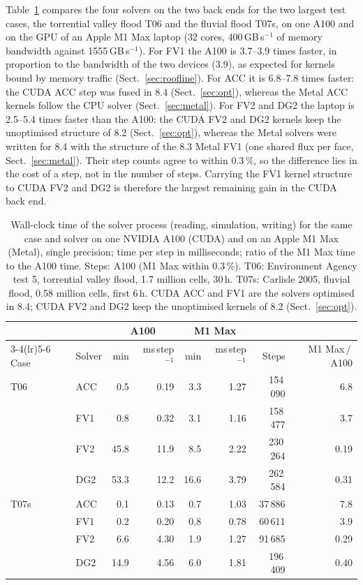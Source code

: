 \documentclass[gmd, manuscript]{copernicus}
\begin{document}
Table~\ref{tab:metaltime} compares the four solvers on the two back ends
for the two largest test cases, the torrential valley flood T06 and the
fluvial flood T07s, on one A100 and on the GPU of an Apple M1 Max laptop (32 cores, 400\,GB\,s$^{-1}$ of memory bandwidth against
1555\,GB\,s$^{-1}$). For FV1 the A100 is 3.7--3.9 times faster, in
proportion to the bandwidth of the two devices (3.9), as expected for kernels
bound by memory traffic (Sect.~\ref{sec:roofline}). For ACC it is 6.8--7.8
times faster: the CUDA ACC step was fused in 8.4 (Sect.~\ref{sec:opt}),
whereas the Metal ACC kernels follow the CPU solver (Sect.~\ref{sec:metal}).
For FV2 and DG2 the laptop is
2.5--5.4 times faster than the A100: the CUDA FV2 and DG2 kernels keep the
unoptimised structure of 8.2 (Sect.~\ref{sec:opt}), whereas the Metal
solvers were written for 8.4
with the structure of the 8.3 Metal FV1 (one shared flux per face,
Sect.~\ref{sec:metal}). Their step counts agree to within 0.3\,\%, so the
difference lies in the cost of a step, not in the number of steps. Carrying
the FV1 kernel structure to CUDA FV2 and DG2 is therefore the largest
remaining gain in the CUDA back end.

\begin{table}[t]
\centering\small
\caption{Wall-clock time of the solver process (reading, simulation, writing)
for the same case and solver on one NVIDIA A100 (CUDA) and on an Apple M1
Max (Metal), single precision; time per step in milliseconds; ratio of the M1
Max time to the A100 time. Steps: A100 (M1 Max within 0.3\,\%). T06:
Environment Agency test 5, torrential valley flood, 1.7 million cells, 30\,h.
T07s: Carlisle 2005, fluvial flood, 0.58 million cells, first 6\,h. CUDA ACC
and FV1 are the solvers optimised in 8.4; CUDA FV2 and DG2 keep the
unoptimised kernels of 8.2 (Sect.~\ref{sec:opt}).}
\label{tab:metaltime}
\begin{tabular}{@{}llrrrrrr@{}}
\toprule
& & \multicolumn{2}{c}{A100} & \multicolumn{2}{c}{M1 Max} & & \\
\cmidrule(lr){3-4}\cmidrule(lr){5-6}
Case & Solver & min & ms\,step$^{-1}$ & min & ms\,step$^{-1}$ & Steps & M1 Max\,/\,A100 \\
\midrule
T06 & ACC & 0.5 & 0.19 & 3.3 & 1.27 & 154\,090 & 6.8 \\
 & FV1 & 0.8 & 0.32 & 3.1 & 1.16 & 158\,477 & 3.7 \\
 & FV2 & 45.8 & 11.9 & 8.5 & 2.22 & 230\,264 & 0.19 \\
 & DG2 & 53.3 & 12.2 & 16.6 & 3.79 & 262\,584 & 0.31 \\
T07s & ACC & 0.1 & 0.13 & 0.7 & 1.03 & 37\,886 & 7.8 \\
 & FV1 & 0.2 & 0.20 & 0.8 & 0.78 & 60\,611 & 3.9 \\
 & FV2 & 6.6 & 4.30 & 1.9 & 1.27 & 91\,685 & 0.29 \\
 & DG2 & 14.9 & 4.56 & 6.0 & 1.81 & 196\,409 & 0.40 \\
\bottomrule
\end{tabular}
\end{table}
\end{document}
